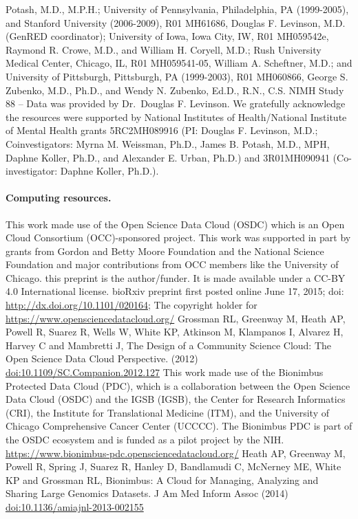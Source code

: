 \documentclass[10pt,letterpaper]{article}
\begin{document}
Potash, M.D., M.P.H.; University of Pennsylvania, Philadelphia, PA
(1999-2005), and Stanford University (2006-2009), R01 MH61686, Douglas
F. Levinson, M.D. (GenRED coordinator); University of Iowa, Iowa City,
IW, R01 MH059542e, Raymond R. Crowe, M.D., and William H. Coryell, M.D.;
Rush University Medical Center, Chicago, IL, R01 MH059541-05, William A.
Scheftner, M.D.; and University of Pittsburgh, Pittsburgh, PA
(1999-2003), R01 MH060866, George S. Zubenko, M.D., Ph.D., and Wendy N.
Zubenko, Ed.D., R.N., C.S. NIMH Study 88 -- Data was provided by
Dr.~Douglas F. Levinson. We gratefully acknowledge the resources were
supported by National Institutes of Health/National Institute of Mental
Health grants 5RC2MH089916 (PI: Douglas F. Levinson, M.D.;
Coinvestigators: Myrna M. Weissman, Ph.D., James B. Potash, M.D., MPH,
Daphne Koller, Ph.D., and Alexander E. Urban, Ph.D.) and 3R01MH090941
(Co-investigator: Daphne Koller, Ph.D.).

\paragraph{Computing resources.}\label{computing-resources}

This work made use of the Open Science Data Cloud (OSDC) which is an
Open Cloud Consortium (OCC)-sponsored project. This work was supported
in part by grants from Gordon and Betty Moore Foundation and the
National Science Foundation and major contributions from OCC members
like the University of Chicago. this preprint is the author/funder. It
is made available under a CC-BY 4.0 International license. bioRxiv
preprint first posted online June 17, 2015; doi:
\url{http://dx.doi.org/10.1101/020164}; The copyright holder for
\url{https://www.opensciencedatacloud.org/} Grossman RL, Greenway M,
Heath AP, Powell R, Suarez R, Wells W, White KP, Atkinson M, Klampanos
I, Alvarez H, Harvey C and Mambretti J, The Design of a Community
Science Cloud: The Open Science Data Cloud Perspective. (2012)
\url{doi:10.1109/SC.Companion.2012.127} This work made use of the
Bionimbus Protected Data Cloud (PDC), which is a collaboration between
the Open Science Data Cloud (OSDC) and the IGSB (IGSB), the Center for
Research Informatics (CRI), the Institute for Translational Medicine
(ITM), and the University of Chicago Comprehensive Cancer Center
(UCCCC). The Bionimbus PDC is part of the OSDC ecosystem and is funded
as a pilot project by the NIH.
\url{https://www.bionimbus-pdc.opensciencedatacloud.org/} Heath AP,
Greenway M, Powell R, Spring J, Suarez R, Hanley D, Bandlamudi C,
McNerney ME, White KP and Grossman RL, Bionimbus: A Cloud for Managing,
Analyzing and Sharing Large Genomics Datasets. J Am Med Inform Assoc
(2014) \url{doi:10.1136/amiajnl-2013-002155}
\end{document}
